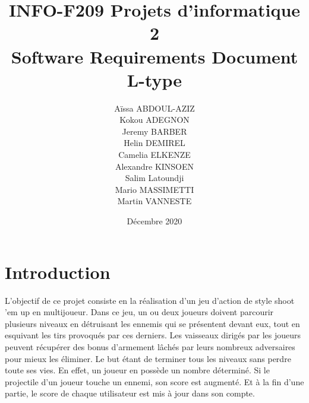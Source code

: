 \documentclass[a4paper,12pt]{article}
\begin{document}
    \begin{titlepage}

        \begin{center}

            \title{\Huge INFO-F209 Projets d’informatique 2 \\
            [1 cm] Software Requirements Document \\ 
            L-type\\[2 cm]}
            \author{Aïssa ABDOUL-AZIZ \\[0,2 cm] Kokou ADEGNON \\[0,2 cm] Jeremy BARBER \\[0,2 cm] Helin DEMIREL \\[0,2 cm] Camelia ELKENZE \\[0,2 cm] Alexandre KINSOEN \\[0,2 cm] Salim Latoundji \\[0,2 cm] Mario MASSIMETTI \\[0,2 cm] Martin VANNESTE \\ [2 cm]}
            \date{Décembre 2020}


        \end{center}

    \end{titlepage}

    \maketitle

\newpage

\tableofcontents

\newpage


\section{Introduction}

L’objectif de ce projet consiste en la réalisation d'un jeu d'action de style shoot 'em up en multijoueur. Dans ce jeu, un ou deux joueurs doivent parcourir plusieurs niveaux en détruisant les ennemis qui se présentent devant eux, tout en esquivant les tirs provoqués par ces derniers. Les vaisseaux dirigés par les joueurs peuvent récupérer des bonus d’armement lâchés par leurs nombreux adversaires pour mieux les éliminer. Le but étant de terminer tous les niveaux sans perdre toute ses vies. En effet, un joueur en possède un nombre déterminé. Si le projectile d'un joueur touche un ennemi, son score est augmenté. Et à la fin d'une partie, le score de chaque utilisateur est mis à jour dans son compte.
\end{document}

